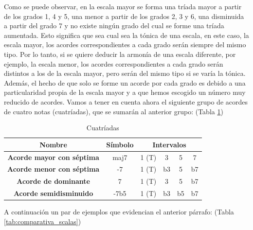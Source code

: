 Como se puede observar, en la escala mayor se forma una tríada mayor a partir de los grados 1, 4 y 5, una menor a partir de los grados 2, 3 y 6, una disminuida a partir del grado 7 y no existe ningún grado del cual se forme una tríada aumentada. Esto significa que sea cual sea la tónica de una escala, en este caso, la escala mayor, los acordes correspondientes a cada grado serán siempre del mismo tipo. Por lo tanto, si se quiere deducir la armonía de una escala diferente, por ejemplo, la escala menor, los acordes correspondientes a cada grado serán distintos a los de la escala mayor, pero serán del mismo tipo si se varía la tónica. Además, el hecho de que solo se forme un acorde por cada grado es debido a una particularidad propia de la escala mayor y a que hemos escogido un número muy reducido de acordes. Vamos a tener en cuenta ahora el siguiente grupo de acordes de cuatro notas (cuatríadas), que se sumarán al anterior grupo: (Tabla \ref{tab:cuatriads})

\begin{table}[h]
    \centering
    \begin{tabular}{c|c|c|c|c|c}       
        \textbf{Nombre} & \textbf{Símbolo} & \multicolumn{4}{c}{\textbf{Intervalos}} \\
        \hline
        \hline
        \textbf{Acorde mayor con séptima} & maj7 & 1 (T) & 3 & 5 & 7\\
        \hline
        \textbf{Acorde menor con séptima} & -7 & 1 (T) & b3 & 5 & b7 \\
        \hline
        \textbf{Acorde de dominante} & 7 & 1 (T) & 3 & 5 & b7\\
        \hline
        \textbf{Acorde semidisminuido} & -7b5 & 1 (T) & b3 & b5 & b7 \\
    \end{tabular}
    \caption{Cuatríadas}
    \label{tab:cuatriads}
\end{table}

A continuación un par de ejemplos que evidencian el anterior párrafo: (Tabla \ref{tab:comparativa_scalas}) 

